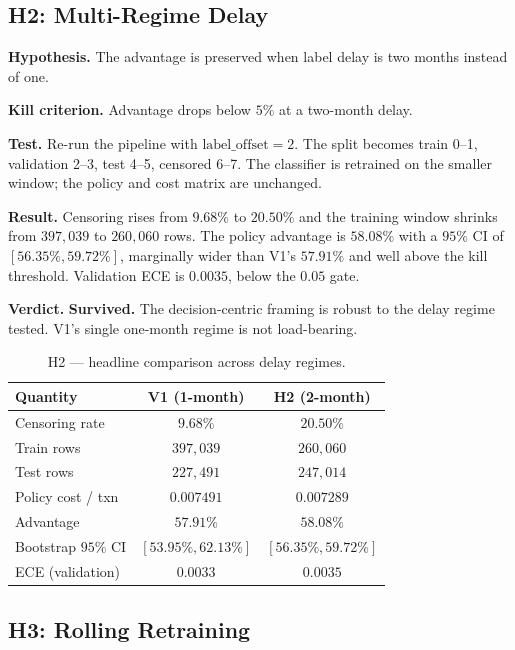 \documentclass[conference]{IEEEtran}
\begin{document}
\subsection{H2: Multi-Regime Delay}

\textbf{Hypothesis.} The advantage is preserved when label delay is
two months instead of one.

\textbf{Kill criterion.} Advantage drops below $5\%$ at a two-month delay.

\textbf{Test.} Re-run the pipeline with $\text{label\_offset} = 2$. The
split becomes train 0--1, validation 2--3, test 4--5, censored 6--7. The
classifier is retrained on the smaller window; the policy and cost matrix
are unchanged.

\textbf{Result.} Censoring rises from $9.68\%$ to $20.50\%$ and the training
window shrinks from $397{,}039$ to $260{,}060$ rows. The policy advantage is
$58.08\%$ with a $95\%$ CI of $[56.35\%, 59.72\%]$, marginally wider than
V1's $57.91\%$ and well above the kill threshold. Validation ECE is
$0.0035$, below the $0.05$ gate.

\textbf{Verdict.} \textbf{Survived.} The decision-centric framing is robust
to the delay regime tested. V1's single one-month regime is not
load-bearing.

\begin{table}[!t]
\caption{H2 — headline comparison across delay regimes.}
\label{tab:h2}
\centering
\small
\begin{tabular}{lcc}
\toprule
Quantity & V1 (1-month) & H2 (2-month) \\
\midrule
Censoring rate           & $9.68\%$             & $20.50\%$ \\
Train rows               & $397{,}039$          & $260{,}060$ \\
Test rows                & $227{,}491$          & $247{,}014$ \\
Policy cost / txn        & $0.007491$           & $0.007289$ \\
Advantage                & $57.91\%$            & $58.08\%$ \\
Bootstrap $95\%$ CI      & $[53.95\%, 62.13\%]$ & $[56.35\%, 59.72\%]$ \\
ECE (validation)         & $0.0033$             & $0.0035$ \\
\bottomrule
\end{tabular}
\end{table}

\subsection{H3: Rolling Retraining}
\end{document}
